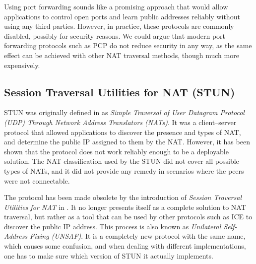 Using port forwarding sounds like a promising approach that would allow applications to control open ports and learn public addresses reliably without using any third parties. However, in practice, these protocols are commonly disabled, possibly for security reasons. We could argue that modern port forwarding protocols such as PCP do not reduce security in any way, as the same effect can be achieved with other NAT traversal methods, though much more expensively.



\subsection{Session Traversal Utilities for NAT (STUN)}

STUN was originally defined in \cite{rfc3489} as \textit{Simple Traversal of User Datagram Protocol (UDP) Through Network Address Translators (NATs)}. It was a client–server protocol that allowed applications to discover the presence and types of NAT, and determine the public IP assigned to them by the NAT. However, it has been shown that the protocol does not work reliably enough to be a deployable solution. The NAT classification used by the STUN did not cover all possible types of NATs, and it did not provide any remedy in scenarios where the peers were not connectable.


The protocol has been made obsolete by the introduction of \textit{Session Traversal Utilities for NAT} in \cite{rfc5389}. It no longer presents itself as a complete solution to NAT traversal, but rather as a tool that can be used by other protocols such as ICE to discover the public IP address. This process is also known as \textit{Unilateral Self-Address Fixing (UNSAF)}. It is a completely new protocol with the same name, which causes some confusion, and when dealing with different implementations, one has to make sure which version of STUN it actually implements.

